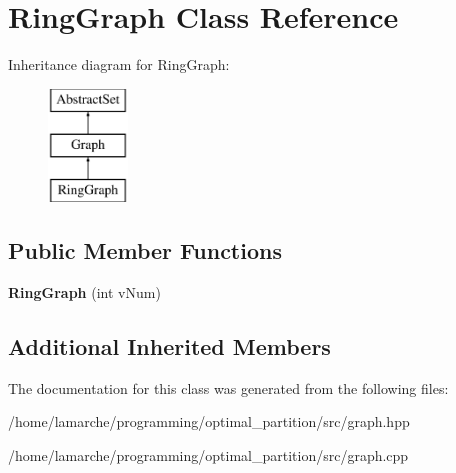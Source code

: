 \hypertarget{classRingGraph}{\section{Ring\-Graph Class Reference}
\label{classRingGraph}
}
Inheritance diagram for Ring\-Graph\-:\begin{figure}[H]
\begin{center}
\leavevmode
\includegraphics[height=3.000000cm]{classRingGraph}
\end{center}
\end{figure}
\subsection*{Public Member Functions}
\begin{DoxyCompactItemize}
\item 
\hypertarget{classRingGraph_a352a09a7580038e222dca138aa05a054}{{\bfseries Ring\-Graph} (int v\-Num)}\label{classRingGraph_a352a09a7580038e222dca138aa05a054}

\end{DoxyCompactItemize}
\subsection*{Additional Inherited Members}


The documentation for this class was generated from the following files\-:\begin{DoxyCompactItemize}
\item 
/home/lamarche/programming/optimal\-\_\-partition/src/graph.\-hpp\item 
/home/lamarche/programming/optimal\-\_\-partition/src/graph.\-cpp\end{DoxyCompactItemize}
